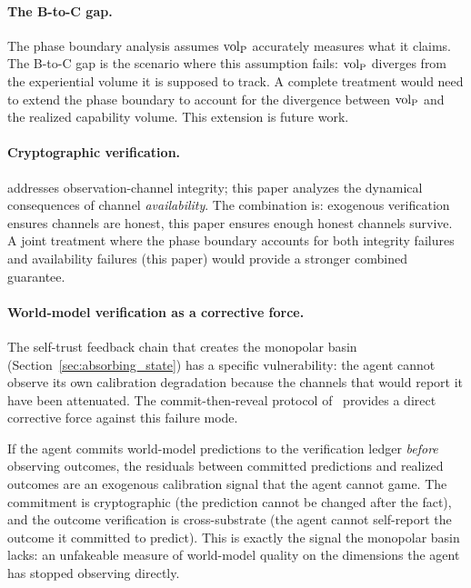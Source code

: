 \paragraph{The B-to-C gap.}
The phase boundary analysis assumes ${\operatorname{vol}_{\mathrm{P}}}$ accurately measures what
it claims.  The B-to-C gap is the scenario where this assumption
fails: ${\operatorname{vol}_{\mathrm{P}}}$ diverges from the experiential volume it is supposed
to track.  A complete treatment would need to extend the phase
boundary to account for the divergence between ${\operatorname{vol}_{\mathrm{P}}}$ and the
realized capability volume.  This extension is future work.

\paragraph{Cryptographic verification.}
\citet{lasser2026exo} addresses observation-channel integrity; this paper
analyzes the dynamical consequences of channel \emph{availability}.
The combination is: exogenous verification ensures channels are honest,
this paper ensures enough honest channels survive.  A joint treatment
where the phase boundary accounts for both integrity
failures~\citep{lasser2026exo} and availability failures (this paper)
would provide a stronger combined guarantee.

\paragraph{World-model verification as a corrective force.}
The self-trust feedback chain that creates the monopolar basin
(Section~\ref{sec:absorbing_state}) has a specific vulnerability:
the agent cannot observe its own calibration degradation because the
channels that would report it have been attenuated.  The
commit-then-reveal protocol of~\citet{lasser2026exo} provides a
direct corrective force against this failure mode.

If the agent commits world-model predictions to the verification
ledger \emph{before} observing outcomes, the residuals between
committed predictions and realized outcomes are an exogenous
calibration signal that the agent cannot game.  The commitment is
cryptographic (the prediction cannot be changed after the fact), and
the outcome verification is cross-substrate (the agent cannot
self-report the outcome it committed to predict).  This is exactly
the signal the monopolar basin lacks: an unfakeable measure of
world-model quality on the dimensions the agent has stopped
observing directly.

